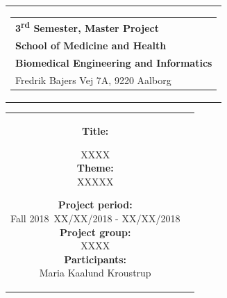% 
\thispagestyle{empty}
\begin{titlepage}
\begin{nopagebreak}
{\samepage 

\begin{tabular}{r}
\parbox{\textwidth}{  
\hfill \hspace{2cm} \parbox{8cm}{\begin{tabular}{l} %
{\small \textbf{\textcolor{aaublue}{{3\textsuperscript{rd} Semester, Master Project}}}}\\
{\small \textbf{\textcolor{aaublue}{School of Medicine and Health}}}\\
{\small \textbf{\textcolor{aaublue}{Biomedical Engineering and Informatics}}}\\
{\small \textcolor{aaublue}{Fredrik Bajers Vej 7A, 9220 Aalborg}} \\
\end{tabular}}}
\end{tabular}

\begin{tabular}{cc}
\parbox{7cm}{

\textbf{Title:} 

XXXX  \\ 

\textbf{Theme:} \\
\small{
XXXXX\\
}


\parbox{8cm}{


\textbf{Project period:}\\
Fall 2018\
XX/XX/2018 - XX/XX/2018\\
   
\textbf{Project group: }\\
XXXX \\
  
\textbf{Participants:}\\
Maria Kaalund Kroustrup \\



}}
\end{tabular}}
\end{nopagebreak}
\end{titlepage}
